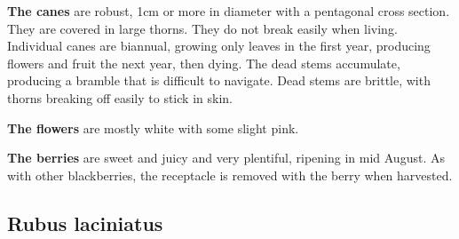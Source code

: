 \textbf{The canes} are robust, 1cm or more in diameter with a pentagonal cross section. They are covered in large thorns. They do not break easily when living. Individual canes are biannual, growing only leaves in the first year, producing flowers and fruit the next year, then dying. The dead stems accumulate, producing a bramble that is difficult to navigate. Dead stems are brittle, with thorns breaking off easily to stick in skin.

\textbf{The flowers} are mostly white with some slight pink. 

\textbf{The berries} are sweet and juicy and very plentiful, ripening in mid August. As with other blackberries, the receptacle is removed with the berry when harvested.



\subsection{Rubus laciniatus}

